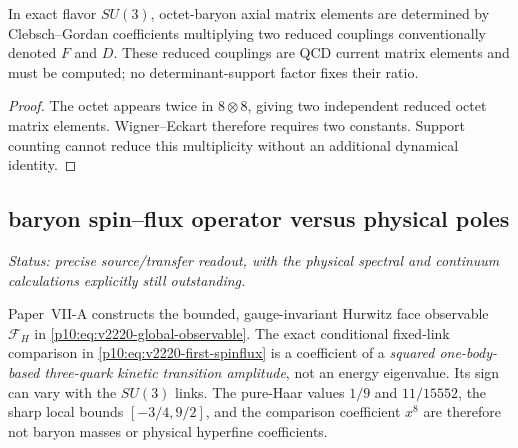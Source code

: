 \documentclass[12pt,a4paper]{article}
\begin{document}
\begin{corollary}
\label{p11:cor:native-octet-axial-current-block}

In exact flavor \(SU(3)\), octet-baryon axial matrix elements are determined by Clebsch--Gordan coefficients multiplying two reduced couplings conventionally denoted \(F\) and \(D\).  These reduced couplings are QCD current matrix elements and must be computed; no determinant-support factor fixes their ratio.
\label{p11:eq:native-FD-block}
\label{p11:eq:native-hyperon-axial-ratios}
\label{p11:eq:native-BBP-axial-coefficients}
\label{p11:eq:native-BBP-GT-extension}
\end{corollary}
\begin{proof}

The octet appears twice in \(8\otimes8\), giving two independent reduced octet matrix elements.  Wigner--Eckart therefore requires two constants.  Support counting cannot reduce this multiplicity without an additional dynamical identity.
\end{proof}


\subsection{baryon spin--flux operator versus physical poles}
\label{p11:sec:v2220-baryon-flux-readouts}
\noindent\textit{Status: precise source/transfer readout, with the physical
spectral and continuum calculations explicitly still outstanding.}

Paper~VII-A constructs the bounded, gauge-invariant Hurwitz face
observable $\mathcal F_H$ in
\eqref{p10:eq:v2220-global-observable}.  The exact conditional
fixed-link comparison in
\eqref{p10:eq:v2220-first-spinflux} is a coefficient of a
\emph{squared one-body-based three-quark kinetic transition amplitude},
not an energy eigenvalue.  Its sign can vary with the $SU(3)$ links.
The pure-Haar values $1/9$ and $11/15552$, the sharp local bounds
$[-3/4,9/2]$, and the comparison coefficient $x^8$ are therefore
not baryon masses or physical hyperfine coefficients.
\end{document}
